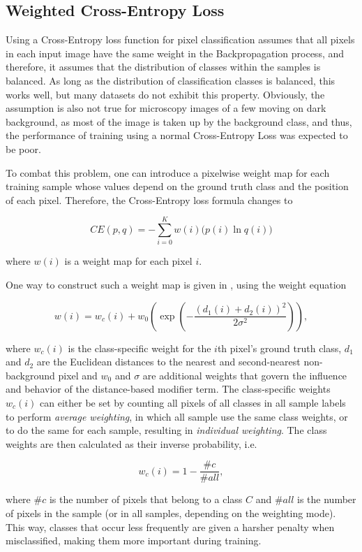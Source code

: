 		\subsection{Weighted Cross-Entropy Loss}

Using a Cross-Entropy loss function for pixel classification assumes that all pixels in each input image have the same weight in the Backpropagation process, and therefore, it assumes that the distribution of classes within the samples is balanced. As long as the distribution of classification classes is balanced, this works well, but many datasets do not exhibit this property. Obviously, the assumption is also not true for microscopy images of a few moving on dark background, as most of the image is taken up by the background class, and thus, the performance of training using a normal Cross-Entropy Loss was expected to be poor.

To combat this problem, one can introduce a pixelwise weight map for each training sample whose values depend on the ground truth class and the position of each pixel. Therefore, the Cross-Entropy loss formula changes to

\[ CE(p, q) = -\sum \limits_{i = 0}^{K} w(i) \bigg ( p(i) \ln q(i) \bigg ) \]

\noindent where $w(i)$ is a weight map for each pixel $i$.

One way to construct such a weight map is given in \cite{unet}, using the weight equation

\[ w(i) = w_c(i) + w_0 \left ( \exp \left (- \frac{(d_1(i) + d_2(i))^2}{2\sigma^2} \right ) \right ), \]

\noindent where $w_c(i)$ is the class-specific weight for the $i$th pixel's ground truth class, $d_1$ and $d_2$ are the Euclidean distances to the nearest and second-nearest non-background pixel and $w_0$ and $\sigma$ are additional weights that govern the influence and behavior of the distance-based modifier term. The class-specific weights $w_c(i)$ can either be set by counting all pixels of all classes in all sample labels to perform \textit{average weighting}, in which all sample use the same class weights, or to do the same for each sample, resulting in \textit{individual weighting}. The class weights are then calculated as their inverse probability, i.e.

\[ w_c(i) = 1 - \frac{\#c}{\#all}, \]

\noindent where $\#c$ is the number of pixels that belong to a class $C$ and $\#all$ is the number of pixels in the sample (or in all samples, depending on the weighting mode). This way, classes that occur less frequently are given a harsher penalty when misclassified, making them more important during training.

